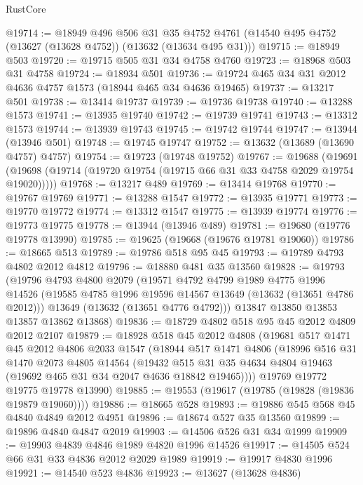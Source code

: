 \begin{lexlean}{RustCore}
\begin{coremodule}
@19714 := @18949
    @496
    @506
    @31
    @35
    @4752
    @4761
    (@14540 @495 @4752 (@13627 (@13628 @4752)) (@13632 (@13634 @495 @31)))
@19715 := @18949 @503
@19720 := @19715 @505 @31 @34 @4758 @4760
@19723 := @18968 @503 @31 @4758
@19724 := @18934 @501
@19736 := @19724 @465 @34 @31 @2012 @4636 @4757 @1573 (@18944 @465 @34 @4636 @19465)
@19737 := @13217 @501
@19738 := @13414 @19737
@19739 := @19736 @19738
@19740 := @13288 @1573
@19741 := @13935 @19740
@19742 := @19739 @19741
@19743 := @13312 @1573
@19744 := @13939 @19743
@19745 := @19742 @19744
@19747 := @13944 (@13946 @501)
@19748 := @19745 @19747
@19752 := @13632 (@13689 (@13690 @4757) @4757)
@19754 := @19723 (@19748 @19752)
@19767 := @19688
    (@19691 (@19698 (@19714 (@19720 @19754 (@19715 @66 @31 @33 @4758 @2029 @19754 @19020)))))
@19768 := @13217 @489
@19769 := @13414 @19768
@19770 := @19767 @19769
@19771 := @13288 @1547
@19772 := @13935 @19771
@19773 := @19770 @19772
@19774 := @13312 @1547
@19775 := @13939 @19774
@19776 := @19773 @19775
@19778 := @13944 (@13946 @489)
@19781 := @19680 (@19776 @19778 @13990)
@19785 := @19625 (@19668 (@19676 @19781 @19060))
@19786 := @18665 @513
@19789 := @19786 @518 @95 @45
@19793 := @19789 @4793 @4802 @2012 @4812
@19796 := @18880 @481 @35 @13560
@19828 := @19793
    (@19796
      @4793
      @4800
      @2079
      (@19571
        @4792
        @4799
        @1989
        @4775
        @1996
        @14526
        (@19585 @4785 @1996 @19596 @14567 @13649 (@13632 (@13651 @4786 @2012)))
        @13649
        (@13632 (@13651 @4776 @4792)))
      @13847
      @13850
      @13853
      @13857
      @13862
      @13868)
@19836 := @18729 @4802 @518 @95 @45 @2012 @4809 @2012 @2107
@19879 := @18928
    @518
    @45
    @2012
    @4808
    (@19681
      @517
      @1471
      @45
      @2012
      @4806
      @2033
      @1547
      (@18944
        @517
        @1471
        @4806
        (@18996
          @516
          @31
          @1470
          @2073
          @4805
          @14564
          (@19432 @515 @31 @35 @4634 @4804 @19463 (@19692 @465 @31 @34 @2047 @4636 @18842 @19465))))
      @19769
      @19772
      @19775
      @19778
      @13990)
@19885 := @19553 (@19617 (@19785 (@19828 (@19836 @19879 @19060))))
@19886 := @18665 @528
@19893 := @19886 @545 @568 @45 @4840 @4849 @2012 @4951
@19896 := @18674 @527 @35 @13560
@19899 := @19896 @4840 @4847 @2019
@19903 := @14506 @526 @31 @34 @1999
@19909 := @19903 @4839 @4846 @1989 @4820 @1996 @14526
@19917 := @14505 @524 @66 @31 @33 @4836 @2012 @2029 @1989
@19919 := @19917 @4830 @1996
@19921 := @14540 @523 @4836
@19923 := @13627 (@13628 @4836)

\end{coremodule}
\end{lexlean}
